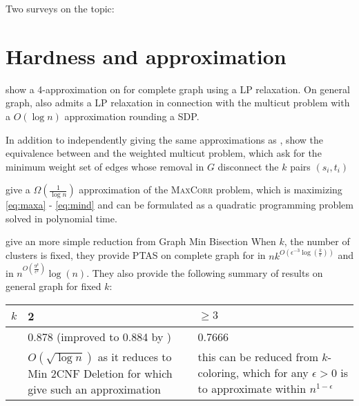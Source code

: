 Two surveys on the topic: \autocites{Becker05}{bonchi2014correlation}

\section{Hardness and approximation}
\label{sec:approx}

\Textcite{Charikar2003} show a 4-approximation on \mind{} for complete graph
using a LP relaxation. On general graph, \mind{} also admits a LP relaxation
in connection with the multicut problem with a $O(\log n)$ approximation
rounding a SDP.

In addition to independently giving the same approximations as
\autocite{Charikar2003}, \textcite{Demaine2006} show the equivalence
between \pcc{} and the weighted multicut problem, which ask for the minimum
weight set of edges whose removal in $G$ disconnect the $k$ pairs $(s_i, t_i)$

\Textcite[Section 4]{Charikar2004} give a $\Omega(\frac{1}{\log n})$
approximation of the \textsc{MaxCorr} problem, which is maximizing
\eqref{eq:maxa} - \eqref{eq:mind} and can be formulated as a quadratic
programming problem solved in polynomial time.

\Textcite{Giotis2006} give an more simple reduction from Graph Min Bisection
When $k$, the number of clusters is fixed, they provide PTAS on complete graph
for \maxa{} in $nk^{O(\epsilon^{-3}\log(\frac{k}{\epsilon}))}$ and \mind{} in
$n^{O(\frac{9^k}{\epsilon^2})}\log(n)$.
They also provide the following summary of results on general graph for fixed
$k$:
\begin{center}
	\begin{tabularx}{\linewidth}{lXX}
		\toprule
		$k$	 & 2 & $\geq 3$ \\
		\midrule
		\maxa{} & 0.878 (improved to 0.884 by \autocite{Mitra2009}) & 0.7666
		\autocite{Swamy2004} \\
		\mind{} & $O(\sqrt{\log n})$ as it reduces to Min 2CNF Deletion for
		which \textcite{min2CNF05} give such an approximation &
		this can be reduced from $k$-coloring, which for any $\epsilon > 0$ is
		\npc{} to approximate within $n^{1-\epsilon}$
		\autocite{InnaproxChroma07} \\
		\bottomrule
	\end{tabularx}
\end{center}

